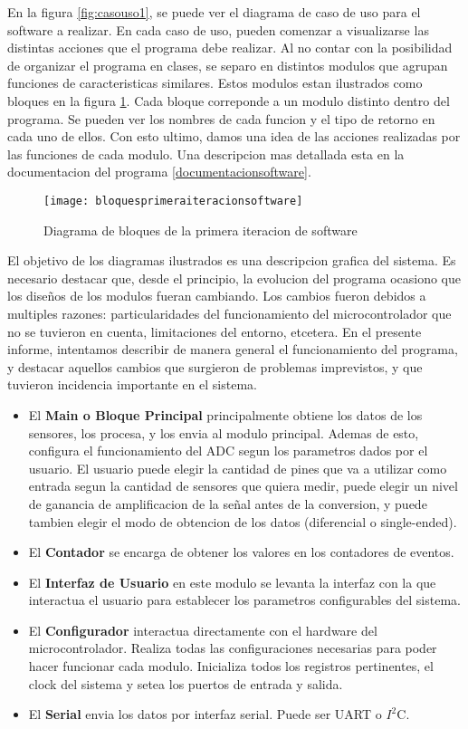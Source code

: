 En la figura \ref{fig:casouso1}, se puede ver el diagrama de caso de uso para el software a realizar. En cada caso de uso, pueden comenzar a visualizarse las distintas acciones que el programa debe realizar. Al no contar con la posibilidad de organizar el programa en clases, se separo en distintos modulos que agrupan funciones de caracteristicas similares. Estos modulos estan ilustrados como bloques en la figura \ref{fig:bloquesprimeraiteracionsoftware}. Cada bloque correponde a un modulo distinto dentro del programa. Se pueden ver los nombres de cada funcion y el tipo de retorno en cada uno de ellos. Con esto ultimo, damos una idea de las acciones realizadas por las funciones de cada modulo. Una descripcion mas detallada esta en la documentacion del programa \ref{documentacionsoftware}.

\begin{figure}[h]
  \centering
  \texttt{[image: bloquesprimeraiteracionsoftware]}
  \caption{Diagrama de bloques de la primera iteracion de software}\label{fig:bloquesprimeraiteracionsoftware}
\end{figure}

El objetivo de los diagramas ilustrados es una descripcion grafica del sistema. Es necesario destacar que, desde el principio, la evolucion del programa ocasiono que los diseños de los modulos fueran cambiando. Los cambios fueron debidos a multiples razones: particularidades del funcionamiento del microcontrolador que no se tuvieron en cuenta, limitaciones del entorno, etcetera. En el presente informe, intentamos describir de manera general el funcionamiento del programa, y destacar aquellos cambios que surgieron de problemas imprevistos, y que tuvieron incidencia importante en el sistema.

\begin{itemize}
  \item El \textbf{Main o Bloque Principal} principalmente obtiene los datos de los sensores, los procesa, y los envia al modulo principal. Ademas de esto, configura el funcionamiento del ADC segun los parametros dados por el usuario. El usuario puede elegir la cantidad de pines que va a utilizar como entrada segun la cantidad de sensores que quiera medir, puede elegir un nivel de ganancia de amplificacion de la señal antes de la conversion, y puede tambien elegir el modo de obtencion de los datos (diferencial o single-ended).
  \item El \textbf{Contador} se encarga de obtener los valores en los contadores de eventos.
  \item El \textbf{Interfaz de Usuario} en este modulo se levanta la interfaz con la que interactua el usuario para establecer los parametros configurables del sistema.
  \item El \textbf{Configurador} interactua directamente con el hardware del microcontrolador. Realiza todas las configuraciones necesarias para poder hacer funcionar cada modulo. Inicializa todos los registros pertinentes, el clock del sistema y setea los puertos de entrada y salida.
  \item El \textbf{Serial} envia los datos por interfaz serial. Puede ser UART o $I^{2}$C.
\end{itemize}

